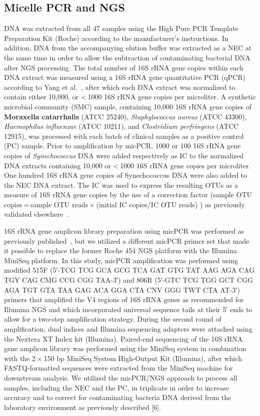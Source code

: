 \subsection*{Micelle PCR and NGS}

DNA was extracted from all 47 samples using the High Pure PCR Template Preparation Kit (Roche) according to the manufacturer’s instructions.
In addition, DNA from the accompanying elution buffer was extracted as a NEC at the same time in order to allow the subtraction of contaminating
bacterial DNA after NGS processing. The total number of 16S rRNA gene copies within each DNA extract was measured using a 16S rRNA gene
quantitative PCR (qPCR) according to Yang et al.~\cite{yang2002quantitative}, after which each DNA extract was normalized to contain either 10,000, or < 1000 16S rRNA
gene copies per microliter. A synthetic microbial community (SMC) sample, containing 10,000 16S rRNA gene copies of \textbf{Moraxella catarrhalis} (ATCC 25240),
\textit{Staphylococcus aureus} (ATCC 43300), \textit{Haemophilus influenzae} (ATCC 10211), and \textit{Clostridium perfringens} (ATCC 12915), was processed with each batch
of clinical samples as a positive control (PC) sample. Prior to amplification by micPCR, 1000 or 100 16S rRNA gene copies of \textit{Synechococcus} DNA
were added respectively as IC to the normalized DNA extracts containing 10,000 or < 1000 16S rRNA gene copies per microliter. One hundred 16S
rRNA gene copies of Synechococcus DNA were also added to the NEC DNA extract. The IC was used to express the resulting OTUs as a measure of
16S rRNA gene copies by the use of a correction factor (sample OTU copies = sample OTU reads × (initial IC copies/IC OTU reads) ) as previously
validated elsewhere~\cite{boers2017novel}.

16S rRNA gene amplicon library preparation using micPCR was performed as previously published~\cite{boers2017novel}, but we utilized a different micPCR primer
set that made it possible to replace the former Roche 454 NGS platform with the Illumina MiniSeq platform. In this study, micPCR amplification
was performed using modified 515F (5′-TCG TCG GCA GCG TCA GAT GTG TAT AAG AGA CAG TGY CAG CMG CCG CGG TAA-3′) and 806R
(5′-GTC TCG TGG GCT CGG AGA TGT GTA TAA GAG ACA GGA CTA CNV GGG TWT CTA AT-3′) primers that amplified the V4 regions of 16S rRNA genes
as recommended for Illumina NGS and which incorporated universal sequence tails at their 5′ ends to allow for a two-step amplification
strategy. During the second round of amplification, dual indices and Illumina sequencing adapters were attached using the Nextera XT
Index kit (Illumina). Paired-end sequencing of the 16S rRNA gene amplicon library was performed using the MiniSeq system in combination
with the 2 × 150 bp MiniSeq System High-Output Kit (Illumina), after which FASTQ-formatted sequences were extracted from the MiniSeq
machine for downstream analysis. We utilized the micPCR/NGS approach to process all samples, including the NEC and the PC, in triplicate
in order to increase accuracy and to correct for contaminating bacteria DNA derived from the laboratory environment as previously described [6].

